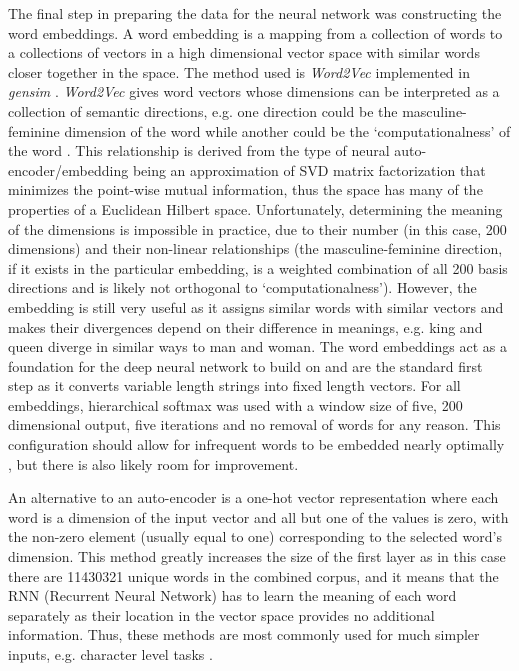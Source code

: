 \documentclass[12pt, a4paper]{article}
\begin{document}
The final step in preparing the data for the neural network was constructing the word embeddings. A word embedding is a mapping from a collection of words to a collections of vectors in a high dimensional vector space with similar words closer together in the space\citep{wordembeding}. The method used is \textit{Word2Vec} \citep{mikolov2013efficient} implemented in \textit{gensim} \citep{rehurek_lrec}. \textit{Word2Vec} gives word vectors whose dimensions can be interpreted as a collection of semantic directions, e.g. one direction could be the masculine-feminine dimension of the word while another could be the `computationalness' of the word \citep{bolukbasi2016man}. This relationship is derived from the type of neural auto-encoder/embedding being an approximation of SVD matrix factorization \citep{levy2014neural} that minimizes the point-wise mutual information, thus the space has many of the properties of a Euclidean Hilbert space. Unfortunately, determining the meaning of the dimensions is impossible in practice, due to their number (in this case, 200 dimensions) and their non-linear relationships (the masculine-feminine direction, if it exists in the particular embedding, is a weighted combination of all 200 basis directions and is likely not orthogonal to `computationalness'). However, the embedding is still very useful as it assigns similar words with similar vectors and makes their divergences depend on their difference in meanings, e.g. king and queen diverge in similar ways to man and woman. The word embeddings act as a foundation for the deep neural network to build on and are the standard first step \citep{deep_learning_chapter12} as it converts variable length strings into fixed length vectors. For all embeddings, hierarchical softmax was used with a window size of five, 200 dimensional output, five iterations and no removal of words for any reason. This configuration should allow for infrequent words to be embedded nearly optimally  \citep{rehurek_lrec}, but there is also likely room for improvement.

An alternative to an auto-encoder is a one-hot vector representation where each word is a dimension of the input vector and all but one of the values is zero, with the non-zero element (usually equal to one) corresponding to the selected word's dimension. This method greatly increases the size of the first layer as in this case there are \num{11430321} unique words in the combined corpus, and it means that the RNN (Recurrent Neural Network) has to learn the meaning of each word separately as their location in the vector space provides no additional information. Thus, these methods are most commonly used for much simpler inputs, e.g. character level tasks \citep{rodriguez1999recurrent}.
 
\end{document}
